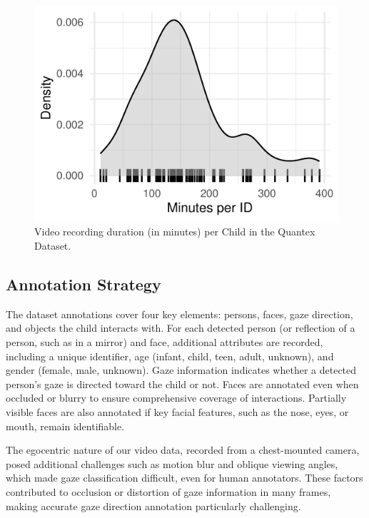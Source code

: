 \documentclass[
  man,floatsintext]{apa6}
\begin{document}
\begin{figure}

{\centering \includegraphics{Quantex_interaction_paper_files/figure-latex/sup-quantex-minutes-per-child-1} 

}

\caption{Video recording duration (in minutes) per Child in the Quantex Dataset.}\label{fig:sup-quantex-minutes-per-child}
\end{figure}

\subsection{Annotation Strategy}\label{sup-annotation-strategy}

The dataset annotations cover four key elements: persons, faces, gaze direction, and objects the child interacts with. For each detected person (or reflection of a person, such as in a mirror) and face, additional attributes are recorded, including a unique identifier, age (infant, child, teen, adult, unknown), and gender (female, male, unknown). Gaze information indicates whether a detected person's gaze is directed toward the child or not. Faces are annotated even when occluded or blurry to ensure comprehensive coverage of interactions. Partially visible faces are also annotated if key facial features, such as the nose, eyes, or mouth, remain identifiable.

The egocentric nature of our video data, recorded from a chest-mounted camera, posed additional challenges such as motion blur and oblique viewing angles, which made gaze classification difficult, even for human annotators. These factors contributed to occlusion or distortion of gaze information in many frames, making accurate gaze direction annotation particularly challenging.
\end{document}
